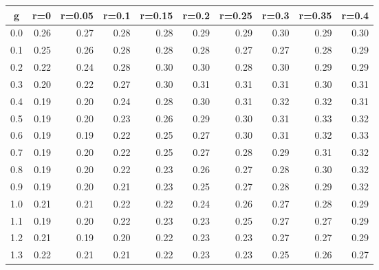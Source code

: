 %
\begin{table}[!tbp]
 \begin{center}
 \begin{tabular}{rrrrrrrrrr}\hline\hline
\multicolumn{1}{c}{g}&\multicolumn{1}{c}{r=0}&\multicolumn{1}{c}{r=0.05}&\multicolumn{1}{c}{r=0.1}&\multicolumn{1}{c}{r=0.15}&\multicolumn{1}{c}{r=0.2}&\multicolumn{1}{c}{r=0.25}&\multicolumn{1}{c}{r=0.3}&\multicolumn{1}{c}{r=0.35}&\multicolumn{1}{c}{r=0.4}\tabularnewline
\hline
0.0&0.26&0.27&0.28&0.28&0.29&0.29&0.30&0.29&0.30\tabularnewline
0.1&0.25&0.26&0.28&0.28&0.28&0.27&0.27&0.28&0.29\tabularnewline
0.2&0.22&0.24&0.28&0.30&0.30&0.28&0.30&0.29&0.29\tabularnewline
0.3&0.20&0.22&0.27&0.30&0.31&0.31&0.31&0.30&0.31\tabularnewline
0.4&0.19&0.20&0.24&0.28&0.30&0.31&0.32&0.32&0.31\tabularnewline
0.5&0.19&0.20&0.23&0.26&0.29&0.30&0.31&0.33&0.32\tabularnewline
0.6&0.19&0.19&0.22&0.25&0.27&0.30&0.31&0.32&0.33\tabularnewline
0.7&0.19&0.20&0.22&0.25&0.27&0.28&0.29&0.31&0.32\tabularnewline
0.8&0.19&0.20&0.22&0.23&0.26&0.27&0.28&0.30&0.32\tabularnewline
0.9&0.19&0.20&0.21&0.23&0.25&0.27&0.28&0.29&0.32\tabularnewline
1.0&0.21&0.21&0.22&0.22&0.24&0.26&0.27&0.28&0.29\tabularnewline
1.1&0.19&0.20&0.22&0.23&0.23&0.25&0.27&0.27&0.29\tabularnewline
1.2&0.21&0.19&0.20&0.22&0.23&0.23&0.27&0.27&0.29\tabularnewline
1.3&0.22&0.21&0.21&0.22&0.23&0.23&0.25&0.26&0.27\tabularnewline
\hline
\end{tabular}

\end{center}

\end{table}

